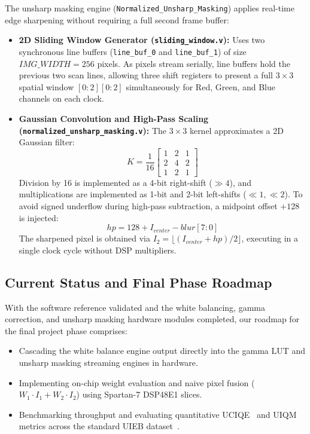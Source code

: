 \documentclass[10pt,twocolumn,letterpaper]{article}
\begin{document}
The unsharp masking engine (\texttt{Normalized\_Unsharp\_Masking}) applies real-time edge sharpening without requiring a full second frame buffer:
\begin{itemize}
    \item \textbf{2D Sliding Window Generator (\texttt{sliding\_window.v}):} Uses two synchronous line buffers (\texttt{line\_buf\_0} and \texttt{line\_buf\_1}) of size $IMG\_WIDTH = 256$ pixels. As pixels stream serially, line buffers hold the previous two scan lines, allowing three shift registers to present a full $3\times3$ spatial window $[0:2][0:2]$ simultaneously for Red, Green, and Blue channels on each clock.
    \item \textbf{Gaussian Convolution and High-Pass Scaling (\texttt{normalized\_unsharp\_masking.v}):} The $3\times3$ kernel approximates a 2D Gaussian filter:
    \begin{equation}
      K = \frac{1}{16} \begin{bmatrix} 1 & 2 & 1 \\ 2 & 4 & 2 \\ 1 & 2 & 1 \end{bmatrix}
    \end{equation}
    Division by 16 is implemented as a 4-bit right-shift ($\gg 4$), and multiplications are implemented as 1-bit and 2-bit left-shifts ($\ll 1, \ll 2$).
    To avoid signed underflow during high-pass subtraction, a midpoint offset $+128$ is injected:
    \begin{equation}
      hp = 128 + I_{center} - blur[7:0]
    \end{equation}
    The sharpened pixel is obtained via $I_2 = \lfloor(I_{center} + hp) / 2\rfloor$, executing in a single clock cycle without DSP multipliers.
\end{itemize}

\subsection{Current Status and Final Phase Roadmap}
\label{subsec:roadmap_cont}

With the software reference validated and the white balancing, gamma correction, and unsharp masking hardware modules completed, our roadmap for the final project phase comprises:
\begin{itemize}
    \item Cascading the white balance engine output directly into the gamma LUT and unsharp masking streaming engines in hardware.
    \item Implementing on-chip weight evaluation and naive pixel fusion ($W_1 \cdot I_1 + W_2 \cdot I_2$) using Spartan-7 DSP48E1 slices.
    \item Benchmarking throughput and evaluating quantitative UCIQE~\cite{yang2015uciqe} and UIQM~\cite{panetta2016uiqm} metrics across the standard UIEB dataset~\cite{li2020underwater}.
\end{itemize}
\end{document}
